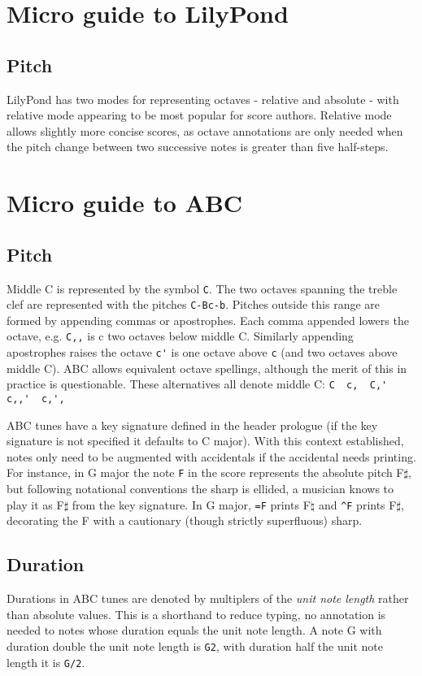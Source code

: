 \documentclass{article}
\begin{document}
\section{Micro guide to LilyPond}
\subsection{Pitch}
LilyPond has two modes for representing octaves - relative and 
absolute - with relative mode appearing to be most popular for 
score authors. Relative mode allows slightly more concise scores, 
as octave annotations are only needed when the pitch change 
between two successive notes is greater than five half-steps.

\section{Micro guide to ABC}
\subsection{Pitch}
Middle C is represented by the symbol \verb+C+.
The two octaves spanning the treble clef are represented
with the pitches \verb+C-Bc-b+. Pitches outside this range are 
formed by appending commas or apostrophes. Each comma appended 
lowers the octave, e.g. \verb+C,,+ is c two octaves below middle 
C. Similarly appending apostrophes raises the octave \verb+c'+ 
is one octave above \verb+c+ (and two octaves above middle C). 
ABC allows equivalent octave spellings, although the merit of 
this in practice is questionable. These alternatives all denote 
middle C: \verb+C  c,  C,'  c,,'  c,',+

ABC tunes have a key signature defined in the header prologue 
(if the key signature is not specified it defaults to C major).
With this context established, notes only need to be augmented 
with accidentals if the accidental needs printing. For instance, 
in G major the note \verb+F+ in the score represents the 
absolute pitch F$\sharp$, but following notational conventions 
the sharp is ellided, a musician knows to play it as 
F$\sharp$ from the key signature. In G major, \verb+=F+ prints 
F$\natural$ and \verb+^F+ prints F$\sharp$, decorating the F 
with a cautionary (though strictly superfluous) sharp. 

\subsection{Duration}
Durations in ABC tunes are denoted by multiplers of the 
\emph{unit note length} rather than absolute values. This is a 
shorthand to reduce typing, no annotation is needed to notes 
whose duration equals the unit note length. A note G with 
duration double the unit note length is \verb+G2+, with duration 
half the unit note length it is \verb+G/2+.
\end{document}
